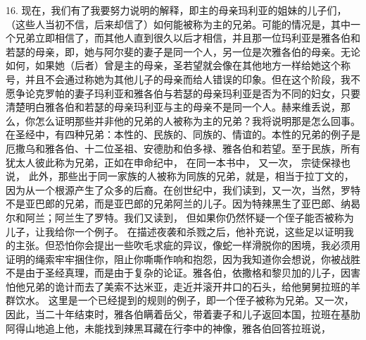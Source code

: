 16. 现在，我们有了我要努力说明的解释，即主的母亲玛利亚的姐妹的儿子们，（这些人当初不信，后来却信了）如何能被称为主的兄弟。可能的情况是，其中一个兄弟立即相信了，而其他人直到很久以后才相信，并且那一位玛利亚是雅各伯和若瑟的母亲，即，她与阿尔斐的妻子是同一个人，另一位是次雅各伯的母亲。无论如何，如果她（后者）曾是主的母亲，圣若望就会像在其他地方一样给她这个称号，并且不会通过称她为其他儿子的母亲而给人错误的印象。但在这个阶段，我不愿争论克罗帕的妻子玛利亚和雅各伯与若瑟的母亲玛利亚是否为不同的妇女，只要清楚明白雅各伯和若瑟的母亲玛利亚与主的母亲不是同一个人。赫来维丢说，那么，你怎么证明那些并非他的兄弟的人被称为主的兄弟？我将说明那是怎么回事。在圣经中，有四种兄弟：本性的、民族的、同族的、情谊的。本性的兄弟的例子是厄撒乌和雅各伯、十二位圣祖、安德肋和伯多禄、雅各伯和若望。至于民族，所有犹太人彼此称为兄弟，正如在申命纪中， 在同一本书中， 又一次， 宗徒保禄也说， 此外，那些出于同一家族的人被称为同族的兄弟，就是，相当于拉丁文的，因为从一个根源产生了众多的后裔。在创世纪中，我们读到，又一次，当然，罗特不是亚巴郎的兄弟，而是亚巴郎的兄弟阿兰的儿子。因为特辣黑生了亚巴郎、纳曷尔和阿兰；阿兰生了罗特。我们又读到， 但如果你仍然怀疑一个侄子能否被称为儿子，让我给你一个例子。 在描述夜袭和杀戮之后，他补充说，这些足以证明我的主张。但恐怕你会提出一些吹毛求疵的异议，像蛇一样滑脱你的困境，我必须用证明的绳索牢牢捆住你，阻止你嘶嘶作响和抱怨，因为我知道你会想说，你被战胜不是由于圣经真理，而是由于复杂的论证。雅各伯，依撒格和黎贝加的儿子，因害怕他兄弟的诡计而去了美索不达米亚，走近并滚开井口的石头，给他舅舅拉班的羊群饮水。 这里是一个已经提到的规则的例子，即一个侄子被称为兄弟。又一次， 因此，当二十年结束时，雅各伯瞒着岳父，带着妻子和儿子返回本国，拉班在基肋阿得山地追上他，未能找到辣黑耳藏在行李中的神像，雅各伯回答拉班说， 